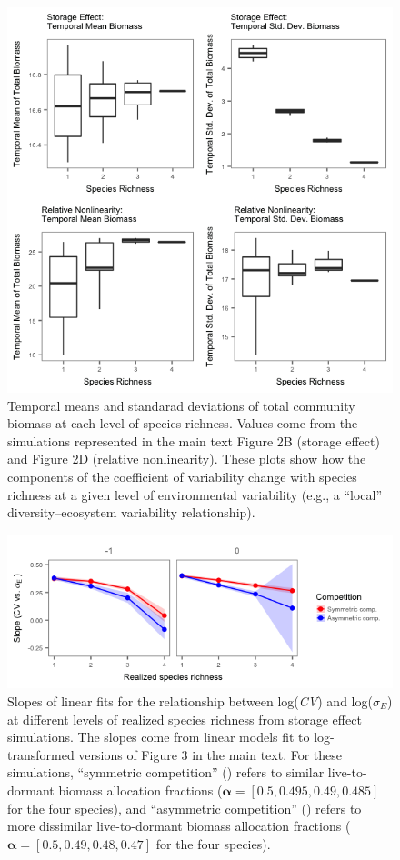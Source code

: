 \documentclass[11pt,]{article}
\begin{document}
\begin{figure}[!ht]
  \centering
      \includegraphics[width=5in]{./components/SI_temp_means_sds_local.png}
  \caption{Temporal means and standarad deviations of total community biomass at each level of species richness. Values come from the simulations represented in the main text Figure 2B (storage effect) and Figure 2D (relative nonlinearity). These plots show how the components of the coefficient of variability change with species richness at a given level of environmental variability (e.g., a ``local'' diversity--ecosystem variability relationship).}
\end{figure}

\newpage{}

\begin{figure}[!ht]
  \centering
      \includegraphics[width=5in]{./components/storage_effect_div+envar_varycomp_loglog_slopes.png}
  \caption{Slopes of linear fits for the relationship between log(\emph{CV}) and log($\sigma_E$) at different levels of realized species richness from storage effect simulations. The slopes come from linear models fit to log-transformed versions of Figure 3 in the main text. For these simulations, ``symmetric competition'' (\tikzcircle{1.5pt}) refers to similar live-to-dormant biomass allocation fractions ($\boldsymbol{\alpha} = [0.5, 0.495, 0.49, 0.485]$ for the four species), and ``asymmetric competition'' (\tikzcircle[fill=blue]{1.5pt}) refers to more dissimilar live-to-dormant biomass allocation fractions ($\boldsymbol{\alpha} = [0.5, 0.49, 0.48, 0.47]$ for the four species).}
\end{figure}
\end{document}
